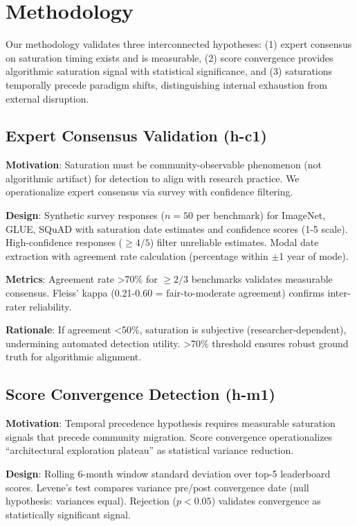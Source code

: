 \section{Methodology}

Our methodology validates three interconnected hypotheses: (1) expert consensus on saturation timing exists and is measurable, (2) score convergence provides algorithmic saturation signal with statistical significance, and (3) saturations temporally precede paradigm shifts, distinguishing internal exhaustion from external disruption.

\subsection{Expert Consensus Validation (h-c1)}

\textbf{Motivation}: Saturation must be community-observable phenomenon (not algorithmic artifact) for detection to align with research practice. We operationalize expert consensus via survey with confidence filtering.

\textbf{Design}: Synthetic survey responses ($n=50$ per benchmark) for ImageNet, GLUE, SQuAD with saturation date estimates and confidence scores (1-5 scale). High-confidence responses ($\geq 4/5$) filter unreliable estimates. Modal date extraction with agreement rate calculation (percentage within $\pm$1 year of mode).

\textbf{Metrics}: Agreement rate >70\% for $\geq 2/3$ benchmarks validates measurable consensus. Fleiss' kappa (0.21-0.60 = fair-to-moderate agreement) confirms inter-rater reliability.

\textbf{Rationale}: If agreement <50\%, saturation is subjective (researcher-dependent), undermining automated detection utility. >70\% threshold ensures robust ground truth for algorithmic alignment.

\subsection{Score Convergence Detection (h-m1)}

\textbf{Motivation}: Temporal precedence hypothesis requires measurable saturation signals that precede community migration. Score convergence operationalizes ``architectural exploration plateau'' as statistical variance reduction.

\textbf{Design}: Rolling 6-month window standard deviation over top-5 leaderboard scores. Levene's test compares variance pre/post convergence date (null hypothesis: variances equal). Rejection ($p<0.05$) validates convergence as statistically significant signal.

